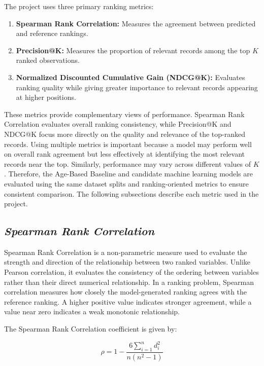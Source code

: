 \documentclass[12pt,a4paper]{report}
\begin{document}
The project uses three primary ranking metrics:

\begin{enumerate}[leftmargin=*]
    \item \textbf{Spearman Rank Correlation:} Measures the agreement between predicted and reference rankings.
    \item \textbf{Precision@K:} Measures the proportion of relevant records among the top $K$ ranked observations.
    \item \textbf{Normalized Discounted Cumulative Gain (NDCG@K):} Evaluates ranking quality while giving greater importance to relevant records appearing at higher positions.
\end{enumerate}

These metrics provide complementary views of performance. Spearman Rank Correlation evaluates overall ranking consistency, while Precision@K and NDCG@K focus more directly on the quality and relevance of the top-ranked records. Using multiple metrics is important because a model may perform well on overall rank agreement but less effectively at identifying the most relevant records near the top. Similarly, performance may vary across different values of $K$. Therefore, the Age-Based Baseline and candidate machine learning models are evaluated using the same dataset splits and ranking-oriented metrics to ensure consistent comparison. The following subsections describe each metric used in the project.

\subsection{\textit{Spearman Rank Correlation}}

Spearman Rank Correlation is a non-parametric measure used to evaluate the strength and direction of the relationship between two ranked variables. Unlike Pearson correlation, it evaluates the consistency of the ordering between variables rather than their direct numerical relationship. In a ranking problem, Spearman correlation measures how closely the model-generated ranking agrees with the reference ranking. A higher positive value indicates stronger agreement, while a value near zero indicates a weak monotonic relationship.

The Spearman Rank Correlation coefficient is given by:

\begin{equation}
\rho =
1 -
\frac{6\sum_{i=1}^{n}d_i^2}
{n(n^2-1)}
\end{equation}
\end{document}
